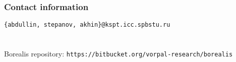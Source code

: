 
\begin{frame}
\frametitle{Contact information}
\texttt{\{abdullin, stepanov, akhin\}@kspt.icc.spbstu.ru} \\ \ \\ \ \\
Borealis repository: \texttt{https://bitbucket.org/vorpal-research/borealis}
\end{frame}

